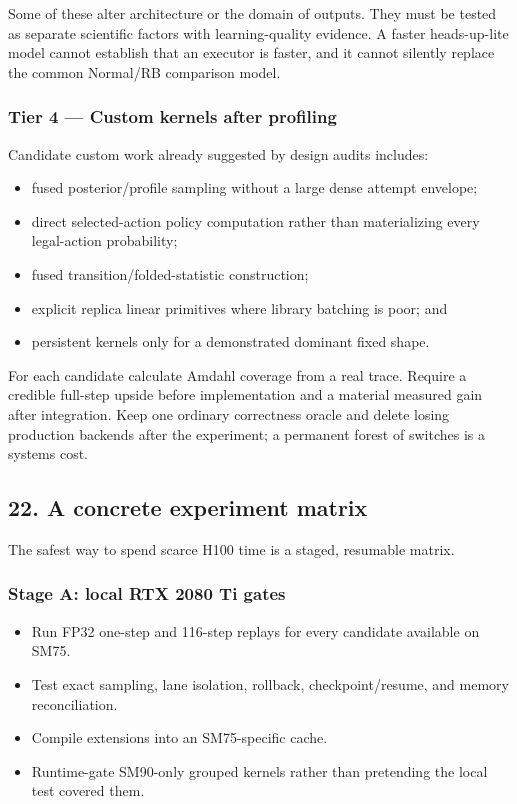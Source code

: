 \documentclass[
  10pt,
  letterpaper,
]{article}
\providecommand{\tightlist}{%
  \setlength{\itemsep}{0pt}\setlength{\parskip}{0pt}}
\begin{document}
Some of these alter architecture or the domain of outputs. They must be
tested as separate scientific factors with learning-quality evidence. A
faster heads-up-lite model cannot establish that an executor is faster,
and it cannot silently replace the common Normal/RB comparison model.

\subsubsection{Tier 4 --- Custom kernels after
profiling}\label{tier-4--custom-kernels-after-profiling}

Candidate custom work already suggested by design audits includes:

\begin{itemize}
\tightlist
\item
  fused posterior/profile sampling without a large dense attempt
  envelope;
\item
  direct selected-action policy computation rather than materializing
  every legal-action probability;
\item
  fused transition/folded-statistic construction;
\item
  explicit replica linear primitives where library batching is poor; and
\item
  persistent kernels only for a demonstrated dominant fixed shape.
\end{itemize}

For each candidate calculate Amdahl coverage from a real trace. Require
a credible full-step upside before implementation and a material
measured gain after integration. Keep one ordinary correctness oracle
and delete losing production backends after the experiment; a permanent
forest of switches is a systems cost.

\subsection{22. A concrete experiment
matrix}\label{22-a-concrete-experiment-matrix}

The safest way to spend scarce H100 time is a staged, resumable matrix.

\subsubsection{Stage A: local RTX 2080 Ti
gates}\label{stage-a-local-rtx-2080-ti-gates}

\begin{itemize}
\tightlist
\item
  Run FP32 one-step and 116-step replays for every candidate available
  on SM75.
\item
  Test exact sampling, lane isolation, rollback, checkpoint/resume, and
  memory reconciliation.
\item
  Compile extensions into an SM75-specific cache.
\item
  Runtime-gate SM90-only grouped kernels rather than pretending the
  local test covered them.
\end{itemize}
\end{document}
